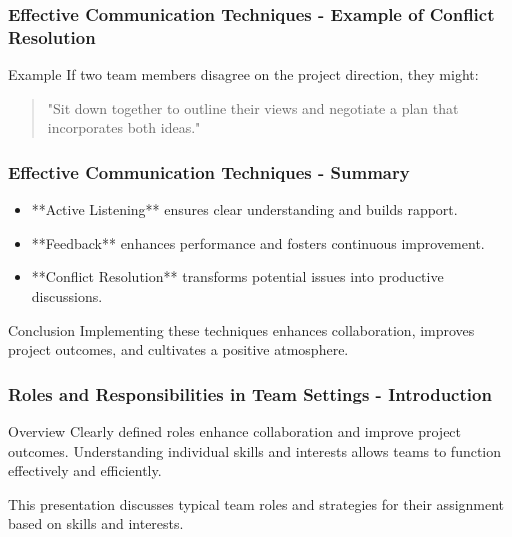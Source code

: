 \documentclass[aspectratio=169]{beamer}
\begin{document}
\begin{frame}[fragile]
    \frametitle{Effective Communication Techniques - Example of Conflict Resolution}
    \begin{block}{Example}
        If two team members disagree on the project direction, they might:
        \begin{quote}
            "Sit down together to outline their views and negotiate a plan that incorporates both ideas."
        \end{quote}
    \end{block}
\end{frame}

\begin{frame}[fragile]
    \frametitle{Effective Communication Techniques - Summary}
    \begin{itemize}
        \item **Active Listening** ensures clear understanding and builds rapport.
        \item **Feedback** enhances performance and fosters continuous improvement.
        \item **Conflict Resolution** transforms potential issues into productive discussions.
    \end{itemize}
    \begin{block}{Conclusion}
        Implementing these techniques enhances collaboration, improves project outcomes, and cultivates a positive atmosphere.
    \end{block}
\end{frame}

\begin{frame}[fragile]
    \frametitle{Roles and Responsibilities in Team Settings - Introduction}
    \begin{block}{Overview}
        Clearly defined roles enhance collaboration and improve project outcomes. 
        Understanding individual skills and interests allows teams to function effectively and efficiently.
    \end{block}
    This presentation discusses typical team roles and strategies for their assignment based on skills and interests.
\end{frame}
\end{document}
